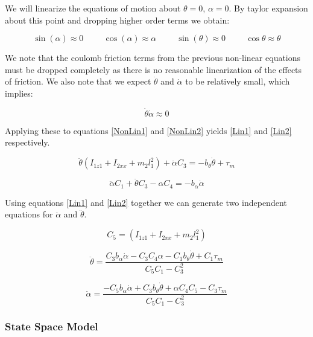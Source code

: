 \documentclass{article}
\theoremstyle{plain}
\theoremstyle{definition}
\theoremstyle{remark}
\begin{document}
We will linearize the equations of motion about $\theta = 0$, $\alpha = 0$.  By taylor expansion about this point and dropping higher order terms we obtain: 

 $$ \sin(\alpha) \approx 0 \hspace{1cm} \cos(\alpha) \approx \alpha \hspace{1cm} \sin(\theta) \approx 0 \hspace{1cm} \cos{\theta} \approx \theta $$

We note that the coulomb friction terms from the previous non-linear equations must be dropped completely as there is no reasonable linearization of the effects of friction.  We also note that we expect $\dot{\theta}$ and $\dot{\alpha}$ to be relatively small, which implies: 

$$ \dot{\theta} \dot{\alpha} \approx 0 $$

Applying these to equations \eqref{NonLin1} and \eqref{NonLin2} yields \eqref{Lin1} and \eqref{Lin2} respectively.

\begin{equation}
\ddot{\theta} \left( I_{1z1} + I_{2xx} + m_2 l_1^2 \right) + \ddot{\alpha} C_3 = -b_{\theta} \dot{\theta} + \tau_{m}
\label{Lin1}
\end{equation}

\begin{equation}
\ddot{\alpha} C_1 + \ddot{\theta} C_3 - \alpha C_4 = -b_{\alpha} \dot{\alpha} 
\label{Lin2}
\end{equation}

Using equations \eqref{Lin1} and \eqref{Lin2} together we can generate two independent equations for $\ddot{\alpha}$ and $\ddot{\theta}$.

$$ C_{5} = (I_{1z1} + I_{2xx} + m_2 l_1^2) $$

\begin{equation}
\ddot{\theta} = \frac{C_3 b_{\alpha} \dot{\alpha} - C_3 C_4 \alpha - C_1 b_{\theta} \dot{\theta} + C_1 \tau_{m}}{ C_5 C_1 - C_3^2}
\label{Lin_Theta}
\end{equation}

\begin{equation}
\ddot{\alpha} = \frac{-C_5 b_{\alpha} \dot{\alpha}  + C_3 b_{\theta} \dot{\theta}  + \alpha C_4 C_5 - C_3 \tau_m }{C_5 C_1 - C_3^2}
\label{Lin_Alpha}
\end{equation}

\subsubsection*{State Space Model}
\end{document}
